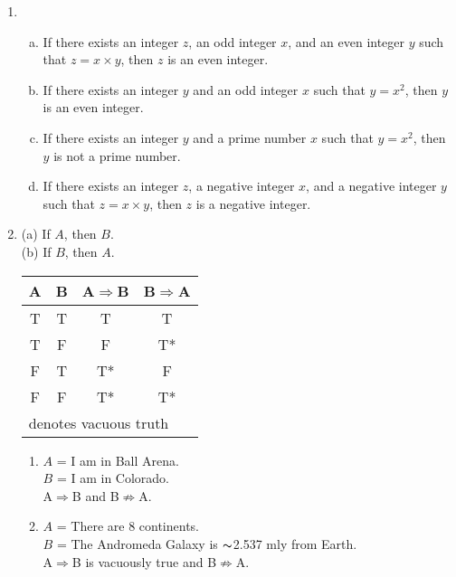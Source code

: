 \documentclass{article}
\begin{document}
\begin{enumerate}[label=(4.\arabic*),start=1]
    \item
        \begin{enumerate}[(a)]
            \item If there exists an integer $z$, an odd integer $x$, and an even integer $y$ such that $z=x \times y$, then $z$ is an even integer. %
            \item If there exists an integer $y$ and an odd integer $x$ such that $y={x^2}$, then $y$ is an even integer.
            \item If there exists an integer $y$ and a prime number $x$ such that $y={x^2}$, then $y$ is not a prime number.
            \item If there exists an integer $z$, a negative integer $x$, and a negative integer $y$ such that $z=x\times y$, then $z$ is a negative integer.
        \end{enumerate}
    \addtocounter{enumi}{1}
    \item (a) If $A$, then $B$. \\
          (b) If $B$, then $A$. \\
        \begin{center}
          \begin{tabular}{c|c||c||c}
            \textbf{A} & \textbf{B} & \textbf{A$\Rightarrow$B} & \textbf{B$\Rightarrow$A}\\
            \hline
            T & T & T & T \\\hline
            T & F & F & \hspace{2mm}T* \\\hline
            F & T & \hspace{2mm}T* & F\\\hline
            F & F & \hspace{2mm}T* & \hspace{2mm}T* \\\hline
            \multicolumn{4}{l}{\footnotesize * denotes vacuous truth}
          \end{tabular}
        \end{center}
        \begin{enumerate}[label=(Condition \arabic*.),start=1]
            \item $A$ = I am in Ball Arena. \\
                  $B$ = I am in Colorado. \\
                  A$\Rightarrow$B and B$\nRightarrow$A.
            \item $A$ = There are 8 continents. \\
                  $B$ = The Andromeda Galaxy is $\thicksim$2.537 mly from Earth. \\
                  A$\Rightarrow$B is vacuously true and B$\nRightarrow$A.


\end{enumerate}
\end{enumerate}
\end{document}
